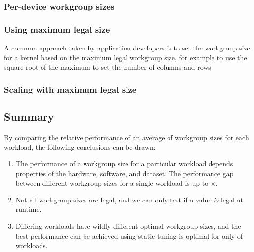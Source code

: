 \subsubsection{Per-device workgroup sizes}


\subsubsection{Using maximum legal size}

A common approach taken by application developers is to set the
workgroup size for a kernel based on the maximum legal workgroup size,
for example to use the square root of the maximum to set the number of
columns and rows.


\subsubsection{Scaling with maximum legal size}



\subsection{Summary}

By comparing the relative performance of an average of
 workgroup sizes for each workload, the
following conclusions can be drawn:

\begin{enumerate}
\item The performance of a workgroup size for a particular workload
  depends properties of the hardware, software, and dataset. The
  performance gap between different workgroup sizes for a single
  workload is up to $\times$.
\item Not all workgroup sizes are legal, and we can only test if a
  value \emph{is} legal at runtime.
\item Differing workloads have wildly different optimal workgroup
  sizes, and the best performance can be achieved using static tuning
  is optimal for only  of
  workloads.
\end{enumerate}

